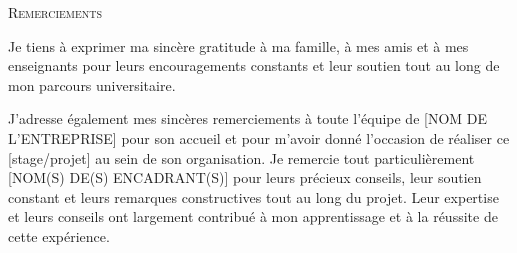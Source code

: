 \begin{titlepage}


\begin{center}
    \textsc{\Huge Remerciements}\\[2cm]
\end{center}

\large
Je tiens à exprimer ma sincère gratitude à ma famille, à mes amis et à mes enseignants pour leurs encouragements constants et leur soutien tout au long de mon parcours universitaire.

\vskip1cm

J'adresse également mes sincères remerciements à toute l'équipe de [NOM DE L'ENTREPRISE] pour son accueil et pour m'avoir donné l'occasion de réaliser ce [stage/projet] au sein de son organisation. Je remercie tout particulièrement [NOM(S) DE(S) ENCADRANT(S)] pour leurs précieux conseils, leur soutien constant et leurs remarques constructives tout au long du projet. Leur expertise et leurs conseils ont largement contribué à mon apprentissage et à la réussite de cette expérience.

\vfill

\end{titlepage}
\restoregeometry
